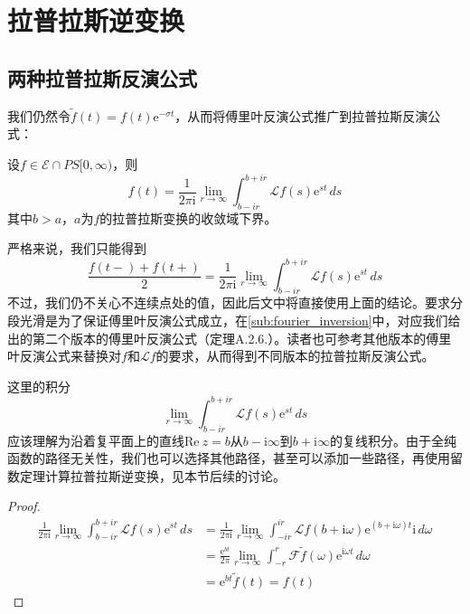 \section{拉普拉斯逆变换}\label{sec:Laplace_Inverse}

\subsection{两种拉普拉斯反演公式}\label{sub:laplace_inversion}
我们仍然令$\tilde{f}(t)=f(t)\mathrm{e}^{-\sigma t}$，从而将傅里叶反演公式推广到拉普拉斯反演公式：
\begin{theorem}[拉普拉斯反演公式]
    设$f\in\mathcal{E}\cap PS[0,\infty) $，则
    \[f(t)=\frac{1}{2\pi \mathrm{i}}\lim_{r\to\infty}\int_{b-ir}^{b +ir}\mathcal{L} f(s)\mathrm{e}^{st}\,ds\]
    其中$b>a$，$a$为$f$的拉普拉斯变换的收敛域下界。
\end{theorem}
\begin{remark}
    严格来说，我们只能得到
    \[\frac{f(t-)+f(t+)}{2}=\frac{1}{2\pi \mathrm{i}}\lim_{r\to\infty}\int_{b-ir}^{b +ir}\mathcal{L} f(s)\mathrm{e}^{st}\,ds\]
    不过，我们仍不关心不连续点处的值，因此后文中将直接使用上面的结论。要求分段光滑是为了保证傅里叶反演公式成立，在\ref{sub:fourier_inversion}中，对应我们给出的第二个版本的傅里叶反演公式（定理A.2.6.）。读者也可参考其他版本的傅里叶反演公式来替换对$f$和$\mathcal{L} f$的要求，从而得到不同版本的拉普拉斯反演公式。
\end{remark}
\begin{remark}
    这里的积分\[\lim_{r\to\infty}\int_{b-ir}^{b +ir}\mathcal{L} f(s)\mathrm{e}^{st}\,ds\]
    应该理解为沿着复平面上的直线$\text{Re}\ z=b$从$b-\mathrm{i}\infty$到$b+\mathrm{i}\infty$的复线积分。由于全纯函数的路径无关性，我们也可以选择其他路径，甚至可以添加一些路径，再使用留数定理计算拉普拉斯逆变换，见本节后续的讨论。
\end{remark}
\begin{proof}
    \begin{align*}
        \frac{1}{2\pi \mathrm{i}}\lim_{r\to\infty}\int_{b-ir}^{b +ir}\mathcal{L} f(s)\mathrm{e}^{st}\,ds&=\frac{1}{2\pi \mathrm{i}}\lim_{r\to\infty}\int_{-ir}^{ir}\mathcal{L} f(b +\mathrm{i}\omega)\mathrm{e}^{(b +\mathrm{i}\omega)t}\mathrm{i}\,d\omega\\
        &=\frac{\mathrm{e}^{b t}}{2\pi}\lim_{r\to\infty}\int_{-r}^{r}\mathcal{F} \tilde{f}(\omega)\mathrm{e}^{\mathrm{i}\omega t}\,d\omega\\
        &=\mathrm{e}^{b t}\tilde{f}(t)=f(t)
    \end{align*}
\end{proof}

